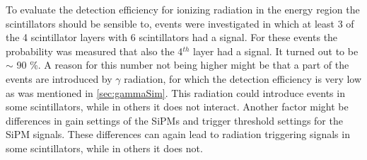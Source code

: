 To evaluate the detection efficiency for ionizing radiation in the energy region the scintillators should be sensible to, events were investigated in which at least 3 of the 4 scintillator layers with 6 scintillators had a signal. For these events the probability was measured that also the 4$^{th}$ layer had a signal. It turned out to be $\sim$ 90 \%. A reason for this number not being higher might be that a part of the events are introduced by $\gamma$ radiation, for which the detection efficiency is very low as was mentioned in \ref{sec:gammaSim}. This radiation could introduce events in some scintillators, while in others it does not interact. Another factor might be differences in gain settings of the SiPMs and trigger threshold settings for the SiPM signals. These differences can again lead to radiation triggering signals in some scintillators, while in others it does not.

